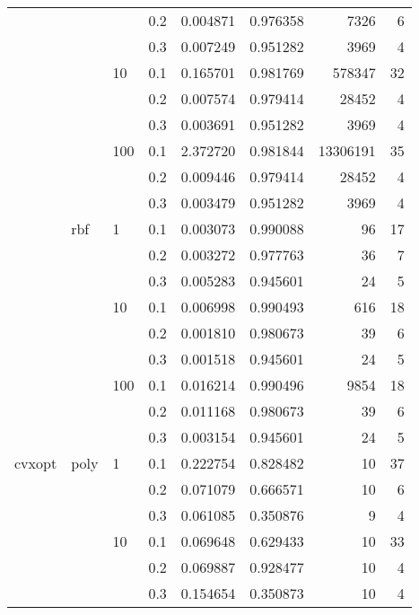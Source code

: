 \begin{table}[H]
\begin{tabular}{llllrrrr}
       &     &     & 0.2 &     0.004871 &  0.976358 &      7326 &     6 \\
       &     &     & 0.3 &     0.007249 &  0.951282 &      3969 &     4 \\
       &     & 10  & 0.1 &     0.165701 &  0.981769 &    578347 &    32 \\
       &     &     & 0.2 &     0.007574 &  0.979414 &     28452 &     4 \\
       &     &     & 0.3 &     0.003691 &  0.951282 &      3969 &     4 \\
       &     & 100 & 0.1 &     2.372720 &  0.981844 &  13306191 &    35 \\
       &     &     & 0.2 &     0.009446 &  0.979414 &     28452 &     4 \\
       &     &     & 0.3 &     0.003479 &  0.951282 &      3969 &     4 \\
       & rbf & 1   & 0.1 &     0.003073 &  0.990088 &        96 &    17 \\
       &     &     & 0.2 &     0.003272 &  0.977763 &        36 &     7 \\
       &     &     & 0.3 &     0.005283 &  0.945601 &        24 &     5 \\
       &     & 10  & 0.1 &     0.006998 &  0.990493 &       616 &    18 \\
       &     &     & 0.2 &     0.001810 &  0.980673 &        39 &     6 \\
       &     &     & 0.3 &     0.001518 &  0.945601 &        24 &     5 \\
       &     & 100 & 0.1 &     0.016214 &  0.990496 &      9854 &    18 \\
       &     &     & 0.2 &     0.011168 &  0.980673 &        39 &     6 \\
       &     &     & 0.3 &     0.003154 &  0.945601 &        24 &     5 \\
cvxopt & poly & 1   & 0.1 &     0.222754 &  0.828482 &        10 &    37 \\
       &     &     & 0.2 &     0.071079 &  0.666571 &        10 &     6 \\
       &     &     & 0.3 &     0.061085 &  0.350876 &         9 &     4 \\
       &     & 10  & 0.1 &     0.069648 &  0.629433 &        10 &    33 \\
       &     &     & 0.2 &     0.069887 &  0.928477 &        10 &     4 \\
       &     &     & 0.3 &     0.154654 &  0.350873 &        10 &     4 \\

\end{tabular}
\end{table}
